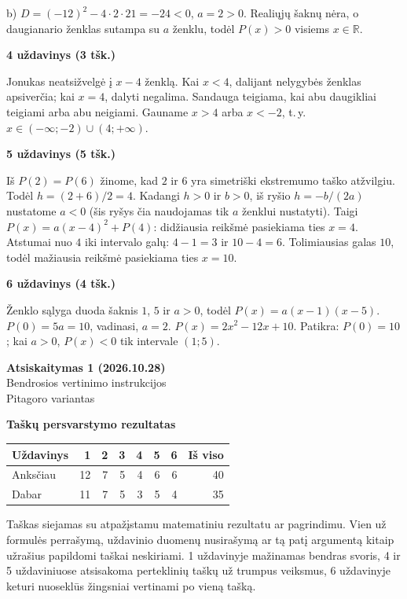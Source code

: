 \documentclass[11pt]{article}
\newcommand{\antraste}[1]{\begin{center}\Large\textbf{Atsiskaitymas 1 (2026.10.28)}\\\large #1\\\normalsize Pitagoro variantas\end{center}}
\newcommand{\sk}[1]{\par\medskip\textbf{#1}\par}
\begin{document}
b) $D=(-12)^2-4\cdot2\cdot21=-24<0$, $a=2>0$.
Realiųjų šaknų nėra, o daugianario ženklas sutampa su $a$ ženklu, todėl $P(x)>0$ visiems $x\in\mathbb R$.
\sk{4 uždavinys (3 tšk.)}
Jonukas neatsižvelgė į $x-4$ ženklą. Kai $x<4$, dalijant nelygybės ženklas apsiverčia; kai $x=4$, dalyti negalima.
Sandauga teigiama, kai abu daugikliai teigiami arba abu neigiami.
Gauname $x>4$ arba $x<-2$, t.\,y. $\boxed{x\in(-\infty;-2)\cup(4;+\infty)}$.
\sk{5 uždavinys (5 tšk.)}
Iš $P(2)=P(6)$ žinome, kad $2$ ir $6$ yra simetriški ekstremumo taško atžvilgiu. Todėl $h=(2+6)/2=4$. Kadangi $h>0$ ir $b>0$, iš ryšio $h=-b/(2a)$ nustatome $a<0$ (šis ryšys čia naudojamas tik $a$ ženklui nustatyti).
Taigi $P(x)=a(x-4)^2+P(4)$: didžiausia reikšmė pasiekiama ties $x=4$.
Atstumai nuo $4$ iki intervalo galų: $4-1=3$ ir $10-4=6$.
Tolimiausias galas $10$, todėl mažiausia reikšmė pasiekiama ties $x=10$.
\sk{6 uždavinys (4 tšk.)}
Ženklo sąlyga duoda šaknis $1$, $5$ ir $a>0$, todėl $P(x)=a(x-1)(x-5)$.
$P(0)=5a=10$, vadinasi, $a=2$.
$\boxed{P(x)=2x^2-12x+10}$.
Patikra: $P(0)=10$; kai $a>0$, $P(x)<0$ tik intervale $(1;5)$.
\newpage
\antraste{Bendrosios vertinimo instrukcijos}\small
\sk{Taškų persvarstymo rezultatas}
\begin{center}\begin{tabular}{lrrrrrrr}\toprule Uždavinys&1&2&3&4&5&6&Iš viso\\\midrule
Anksčiau&12&7&5&4&6&6&40\\
Dabar&11&7&5&3&5&4&35\\\bottomrule\end{tabular}\end{center}
Taškas siejamas su atpažįstamu matematiniu rezultatu ar pagrindimu. Vien už formulės perrašymą, uždavinio duomenų nusirašymą ar tą patį argumentą kitaip užrašius papildomi taškai neskiriami.
1 uždavinyje mažinamas bendras svoris, 4 ir 5 uždaviniuose atsisakoma perteklinių taškų už trumpus veiksmus, 6 uždavinyje keturi nuoseklūs žingsniai vertinami po vieną tašką.
\end{document}
